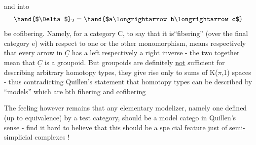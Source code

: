  \quad and \quad {}
into
\[ \hand{$\Delta$}_2 = \hand{$a\longrightarrow b\longrightarrow c$} \]
be cofibering. Namely, for a category C, to say that it is``fibering''
(over the final category e) with respect to one or the other monomorphism,
means respectively that every arrow in $\underline{C}$ has a left respectively a right
inverse - the two together mean that $\underline{C}$ is a groupoid. But groupoids are
definitely \uline{not} sufficient for describing arbitrary homotopy types, they
give rise only to sums of K($\pi$,1) spaces \xout{\unsure{(}} - thus contradicting Quillen's
statement that homotopy types can be described by ``models'' which are bth
fibering and cofibering\hand{!}

The feeling however remains that any elementary modelizer, namely one
defined (up to equivalence) by a test category, should be a  model catego
in Quillen's sense -  find it hard to believe that this should be a spe%
cial feature just of semi-simplicial complexes !

